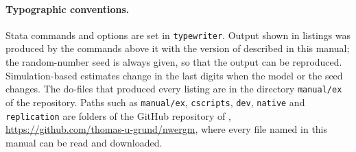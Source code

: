 \paragraph{Typographic conventions.} Stata commands and options are set in \texttt{typewriter}. Output shown in listings was produced by the commands above it with the version of \nwergm{} described in this manual; the random-number seed is always given, so that the output can be reproduced. Simulation-based estimates change in the last digits when the model or the seed changes. The do-files that produced every listing are in the directory \texttt{manual/ex} of the repository. Paths such as \texttt{manual/ex}, \texttt{cscripts}, \texttt{dev}, \texttt{native} and \texttt{replication} are folders of the GitHub repository of \nwergm{}, \url{https://github.com/thomas-u-grund/nwergm}, where every file named in this manual can be read and downloaded.

